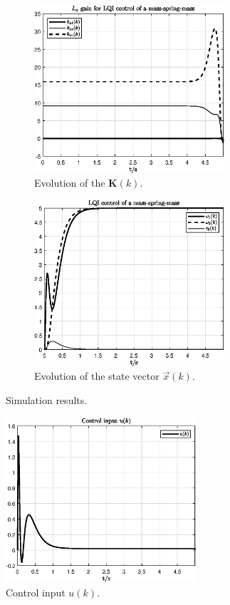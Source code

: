 \documentclass[11pt,a4paper,oneside]{book}
\numberwithin{equation}{section}
\theoremstyle{it}
\theoremstyle{definition}
\begin{document}
\begin{figure}[H]
	\centering
	\begin{subfigure}{.5\textwidth}
		\centering
		\includegraphics[width = 200pt, 
		keepaspectratio]{figures/optimal_control/Kservo.eps}
		\captionsetup{width=0.65\textwidth, font=footnotesize}
		\caption{Evolution of the $\mathbf{K}(k)$.}
		\label{figure_k}
	\end{subfigure}%
	\begin{subfigure}{.5\textwidth}
		\centering
		\includegraphics[width = 200pt, 
		keepaspectratio]{figures/optimal_control/state_servo.eps}
		\captionsetup{width=0.65\textwidth, font=footnotesize}
		\caption{Evolution of the state vector $\vec{x}(k)$.}
		\label{figure_state}
	\end{subfigure}
	\captionsetup{width=0.5\textwidth, font=small}
	\caption{Simulation results.}
	\label{}
\end{figure}
\begin{figure}[H]
	\centering
	\includegraphics[width = 200pt, 
	keepaspectratio]{figures/optimal_control/u_servo.eps}
	\captionsetup{width=0.5\textwidth, font=small}
	\caption{Control input $u(k)$.}
	\label{figure_ctrlu}
\end{figure}
\end{document}
